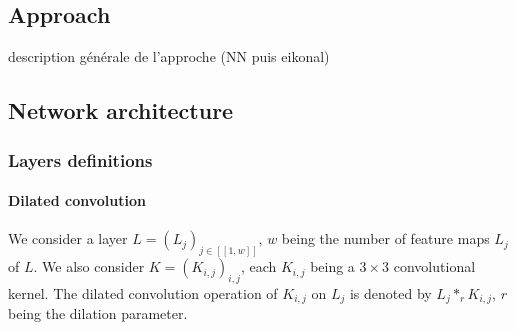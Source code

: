 \documentclass{article}
\begin{document}
    \subsection{Approach}
    description générale de l'approche (NN puis eikonal)
    \subsection{Network architecture}
        \subsubsection{Layers definitions}

            \paragraph{Dilated convolution}\label{par:dilated} We consider a layer $L=(L_j)_{j\in [\![1,w]\!]}$, $w$ being the number of feature maps $L_j$ of $L$. We also consider $K=(K_{i,j})_{i,j}$, each $K_{i,j}$ being a $3\times 3$ convolutional kernel. The dilated convolution operation of $K_{i,j}$ on $L_j$ is denoted by $L_j*_r K_{i,j}$, $r$ being the dilation parameter.
\end{document}
